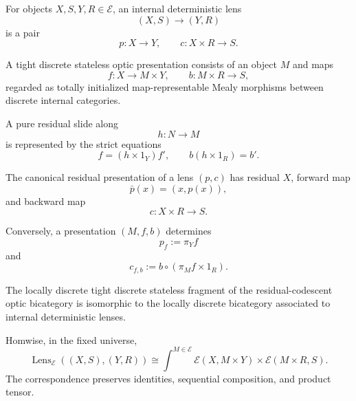 For objects \(X,S,Y,R\in\mathcal E\), an internal deterministic lens
\[
  (X,S)\longrightarrow(Y,R)
\]
is a pair
\[
  p:X\to Y,
  \qquad
  c:X\times R\to S.
\]

A tight discrete stateless optic presentation consists of an object \(M\) and maps
\[
  f:X\longrightarrow M\times Y,
  \qquad
  b:M\times R\longrightarrow S,
\]
regarded as totally initialized map-representable Mealy morphisms between discrete internal
categories.

A pure residual slide along
\[
  h:N\to M
\]
is represented by the strict equations
\[
  f=(h\times1_Y)f',
  \qquad
  b(h\times1_R)=b'.
\]

\begin{definition}
\label{def:canonical-lens-presentation}
The canonical residual presentation of a lens \((p,c)\) has residual \(X\), forward map
\[
  \bar p(x)=(x,p(x)),
\]
and backward map
\[
  c:X\times R\to S.
\]
\end{definition}

Conversely, a presentation \((M,f,b)\) determines
\[
  p_f:=\pi_Yf
\]
and
\[
  c_{f,b}
  :=
  b\circ(\pi_Mf\times1_R).
\]

\begin{theorem}
\label{thm:internal-lens-optic-correspondence}
The locally discrete tight discrete stateless fragment of the residual-codescent optic bicategory is
isomorphic to the locally discrete bicategory associated to internal deterministic lenses.

Homwise, in the fixed universe,
\[
  \operatorname{Lens}_{\mathcal E}((X,S),(Y,R))
  \cong
  \int^{M\in\mathcal E}
  \mathcal E(X,M\times Y)
  \times
  \mathcal E(M\times R,S).
\]
The correspondence preserves identities, sequential composition, and product tensor.
\end{theorem}


